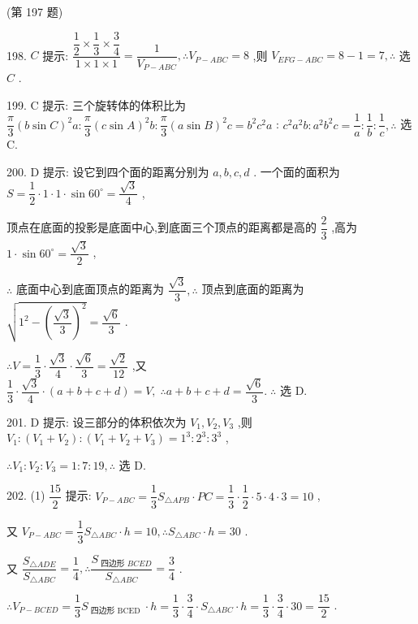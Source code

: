 (第 197 题)

198. $C$ 提示: $\dfrac{\dfrac{1}{2} \times  \dfrac{1}{3} \times  \dfrac{3}{4}}{1 \times  1 \times  1} = \dfrac{1}{{V}_{P - {ABC}}},\therefore {V}_{P - {ABC}} = 8$ ,则 ${V}_{{EFG} - {ABC}} = 8 - 1 = 7,\therefore$ 选 $C$ .

199. C 提示: 三个旋转体的体积比为 $\dfrac{\pi }{3}{\left( b\sin C\right) }^{2}a : \dfrac{\pi }{3}{\left( c\sin A\right) }^{2}b : \dfrac{\pi }{3}{\left( a\sin B\right) }^{2}c = {b}^{2}{c}^{2}a$ : ${c}^{2}{a}^{2}b : {a}^{2}{b}^{2}c = \dfrac{1}{a} : \dfrac{1}{b} : \dfrac{1}{c},\therefore$ 选 C.

200. D 提示: 设它到四个面的距离分别为 $a,b,c,d$ . 一个面的面积为 $S = \dfrac{1}{2} \cdot  1 \cdot  1 \cdot  \sin {60}^{ \circ  } = \dfrac{\sqrt{3}}{4}$ ,

顶点在底面的投影是底面中心,到底面三个顶点的距离都是高的 $\dfrac{2}{3}$ ,高为 $1 \cdot  \sin {60}^{ \circ  } = \dfrac{\sqrt{3}}{2}$ ,

$\therefore$ 底面中心到底面顶点的距离为 $\dfrac{\sqrt{3}}{3},\therefore$ 顶点到底面的距离为 $\sqrt{{1}^{2} - {\left( \dfrac{\sqrt{3}}{3}\right) }^{2}} = \dfrac{\sqrt{6}}{3}$ .

$\therefore V = \dfrac{1}{3} \cdot  \dfrac{\sqrt{3}}{4} \cdot  \dfrac{\sqrt{6}}{3} = \dfrac{\sqrt{2}}{12}$ ,又 $\dfrac{1}{3} \cdot  \dfrac{\sqrt{3}}{4} \cdot  \left( {a + b + c + d}\right)  = V,\;\therefore a + b + c + d = \dfrac{\sqrt{6}}{3}.\;\therefore$ 选 D.

201. D 提示: 设三部分的体积依次为 ${V}_{1},{V}_{2},{V}_{3}$ ,则 ${V}_{1} : \left( {{V}_{1} + {V}_{2}}\right)  : \left( {{V}_{1} + {V}_{2} + {V}_{3}}\right)  = {1}^{3} : {2}^{3} : {3}^{3}$ ,

$\therefore {V}_{1} : {V}_{2} : {V}_{3} = 1 : 7 : {19},\therefore$ 选 D.

202. (1) $\dfrac{15}{2}$ 提示: ${V}_{P - {ABC}} = \dfrac{1}{3}{S}_{\bigtriangleup {APB}} \cdot  {PC} = \dfrac{1}{3} \cdot  \dfrac{1}{2} \cdot  5 \cdot  4 \cdot  3 = {10}$ ,

又 ${V}_{P - {ABC}} = \dfrac{1}{3}{S}_{\bigtriangleup {ABC}} \cdot  h = {10},\therefore {S}_{\bigtriangleup {ABC}} \cdot  h = {30}$ .

又 $\dfrac{{S}_{\bigtriangleup {ADE}}}{{S}_{\bigtriangleup {ABC}}} = \dfrac{1}{4},\therefore \dfrac{{S}_{\text{ 四边形 }{BCED}}}{{S}_{\bigtriangleup {ABC}}} = \dfrac{3}{4}$ .

$\therefore {V}_{P - {BCED}} = \dfrac{1}{3}{S}_{\text{ 四边形 BCED }} \cdot  h = \dfrac{1}{3} \cdot  \dfrac{3}{4} \cdot  {S}_{\bigtriangleup {ABC}} \cdot  h = \dfrac{1}{3} \cdot  \dfrac{3}{4} \cdot  {30} = \dfrac{15}{2}$ .

